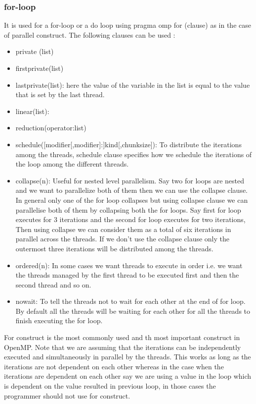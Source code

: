 \documentclass[12pt]{book}
\begin{document}
\subsubsection{for-loop}
It is used for a for-loop or a do loop using pragma omp for (clause) as in the case of parallel construct.
The following clauses can be used :
\begin{itemize}
\item private (list)
\item firstprivate(list)
\item lastprivate(list): here the value of the variable in the list is equal to the value that is set by the last thread.
\item linear(list):
\item reduction(operator:list)
\item schedule([modifier[,modifier]:]kind[,chunksize]): To 
distribute the iterations among 
the threads, schedule clause specifies how 
we schedule the iterations of the loop among the different threads.
\item collapse(n): Useful for nested level parallelism. Say two for loops are nested and we want to parallelize both of them then we can use the collapse clause. In general only one of the 
for loop collapses but using collapse clause we can parallelise both of them by collapsing both the for loops. Say first for loop executes for 3 iterations and the second for loop executes for two iterations, Then
using collapse we can consider them as a total of six iterations in parallel across the threads. If we don't use the collapse clause only the outermost three iterations will be distributed among the threads.
\item ordered(n): In some cases we want threads to execute in order i.e. we want the threads managed by the first thread to be executed first and then the second thread and so on.
\item nowait: To tell the threads not to wait for each other at the end of for loop. By default all the threads will be waiting for each other for all the threads to finish executing the for loop.
\end{itemize}
For construct is the most commonly used and th most important construct in OpenMP.
Note that we are assuming that the iterations can be independently executed and simultaneously in parallel by the threads.
This works as long as the iterations are not dependent on each other whereas in the case when the iterations are dependent on each other say we are using a value in the loop which is dependent on the value resulted in previous loop,
in those cases the programmer should not use for construct.
\end{document}
